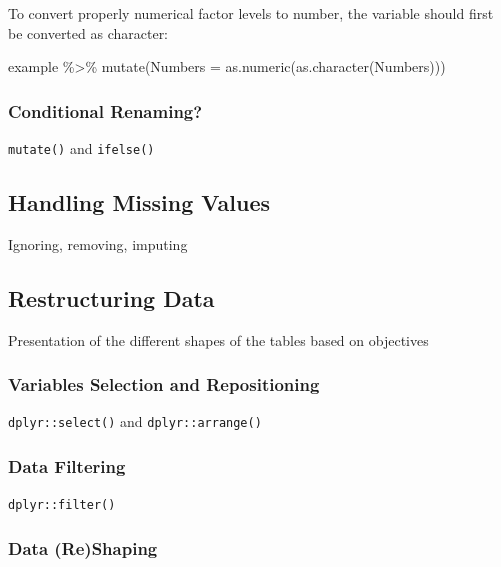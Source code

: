 \documentclass[
]{book}
\newenvironment{Shaded}{\begin{snugshade}}{\end{snugshade}}
\newcommand{\AttributeTok}[1]{\textcolor[rgb]{0.77,0.63,0.00}{#1}}
\newcommand{\FunctionTok}[1]{\textcolor[rgb]{0.00,0.00,0.00}{#1}}
\newcommand{\NormalTok}[1]{#1}
\newcommand{\SpecialCharTok}[1]{\textcolor[rgb]{0.00,0.00,0.00}{#1}}
\begin{document}
To convert properly numerical factor levels to number, the variable should first be converted as character:

\begin{Shaded}
\begin{Highlighting}[]
\NormalTok{example }\SpecialCharTok{\%\textgreater{}\%}
  \FunctionTok{mutate}\NormalTok{(}\AttributeTok{Numbers =} \FunctionTok{as.numeric}\NormalTok{(}\FunctionTok{as.character}\NormalTok{(Numbers)))}
\end{Highlighting}
\end{Shaded}

\hypertarget{conditional-renaming}{%
\subsubsection{Conditional Renaming?}\label{conditional-renaming}}

\texttt{mutate()} and \texttt{ifelse()}

\hypertarget{handling-missing-values}{%
\subsection{Handling Missing Values}\label{handling-missing-values}}

Ignoring, removing, imputing

\hypertarget{restructuring-data}{%
\subsection{Restructuring Data}\label{restructuring-data}}

Presentation of the different shapes of the tables based on objectives

\hypertarget{variables-selection-and-repositioning}{%
\subsubsection{Variables Selection and Repositioning}\label{variables-selection-and-repositioning}}

\texttt{dplyr::select()} and \texttt{dplyr::arrange()}

\hypertarget{data-filtering}{%
\subsubsection{Data Filtering}\label{data-filtering}}

\texttt{dplyr::filter()}

\hypertarget{data-reshaping}{%
\subsubsection{Data (Re)Shaping}\label{data-reshaping}}
\end{document}
